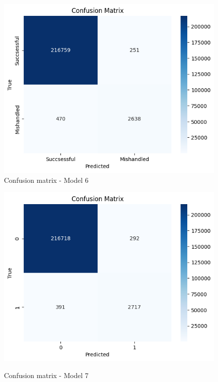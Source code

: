 \documentclass[12pt]{article}
\begin{document}
\begin{figure}
\begin{minipage}[c]{0.45\linewidth}
    \includegraphics[width=1\textwidth]{Confusion_matrix_Model 6.png}\\
    \caption{Confusion matrix - Model 6}
\end{minipage}%
\hfill
\begin{minipage}[c]{0.45\linewidth}
\includegraphics[width=1\textwidth]{Confusion_matrix_Model 7.png}\\
\caption{Confusion matrix - Model 7}
\end{minipage}
\end{figure}
\end{document}
